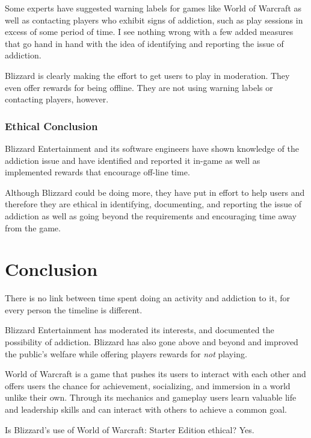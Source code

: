 \documentclass[11pt]{article}
\begin{document}
\begin{multicols}{2}
Some experts have suggested warning labels for games like World of Warcraft as well as contacting players who exhibit signs of addiction, such as play sessions in excess of some period of time. \cite{MMORPGSocialResponsibility} I see nothing wrong with a few added measures that go hand in hand with the idea of identifying and reporting the issue of addiction.

Blizzard is clearly making the effort to get users to play in moderation. They even offer rewards for being offline. They are not using warning labels or contacting players, however.

\subsubsection{Ethical Conclusion}
Blizzard Entertainment and its software engineers have shown knowledge of the addiction issue and have identified and reported it in-game as well as implemented rewards that encourage off-line time.

Although Blizzard could be doing more, they have put in effort to help users and therefore they are ethical in identifying, documenting, and reporting the issue of addiction as well as going beyond the requirements and encouraging time away from the game.

\section{Conclusion}
There is no link between time spent doing an activity and addiction to it, for every person the timeline is different.

Blizzard Entertainment has moderated its interests, and documented the possibility of addiction. Blizzard has also gone above and beyond and improved the public's welfare while offering players rewards for \emph{not} playing.

World of Warcraft is a game that pushes its users to interact with each other and offers users the chance for achievement, socializing, and immersion in a world unlike their own. Through its mechanics and gameplay users learn valuable life and leadership skills and can interact with others to achieve a common goal.

Is Blizzard's use of World of Warcraft: Starter Edition ethical? Yes.

\end{multicols}
\newpage

\nocite{*}




\end{document}
